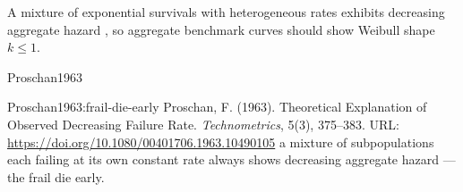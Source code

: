 \documentclass[11pt]{article}
\begin{document}
A mixture of exponential survivals with heterogeneous rates exhibits
decreasing aggregate hazard , so
aggregate benchmark curves should show Weibull shape $k \le 1$.\slugfootnote

\slugconvention

\begin{thebibliography}{Proschan1963}
\setlength{\itemsep}{7pt}

%
  {Proschan1963:frail-die-early}%
  {Proschan, F. (1963). Theoretical Explanation of Observed Decreasing
   Failure Rate. \emph{Technometrics}, 5(3), 375--383.
   URL: \url{https://doi.org/10.1080/00401706.1963.10490105}}%
  {a mixture of subpopulations each failing at its own constant rate always
   shows decreasing aggregate hazard --- the frail die early.}

\end{thebibliography}
\end{document}
